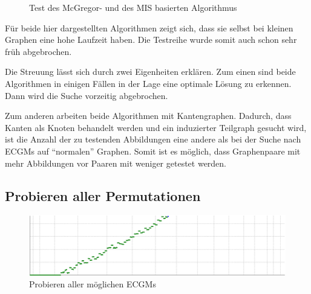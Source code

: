 \begin{figure}[htb]
\centering
\hspace*{\fill} %
\hspace*{\fill} %
\hspace*{\fill} %
\caption{Test des McGregor- und des MIS basierten Algorithmus}
\label{pic:MG_MIS}
\end{figure}

Für beide hier dargestellten Algorithmen zeigt sich, dass sie selbst bei kleinen 
Graphen eine hohe Laufzeit haben. Die Testreihe wurde somit auch schon sehr früh 
abgebrochen. 

Die Streuung lässt sich durch zwei Eigenheiten erklären. 
Zum einen sind beide 
Algorithmen in einigen Fällen in der Lage eine optimale Lösung zu erkennen. Dann wird 
die Suche vorzeitig abgebrochen. 

Zum anderen 
arbeiten beide Algorithmen mit Kantengraphen. Dadurch, dass Kanten als Knoten behandelt 
werden und ein induzierter Teilgraph gesucht wird, ist die Anzahl der zu testenden 
Abbildungen eine andere als bei der Suche nach ECGMs auf "`normalen"' Graphen. Somit 
ist es möglich, dass Graphenpaare mit mehr Abbildungen vor Paaren mit weniger 
getestet werden.

\subsection{Probieren aller Permutationen}
\begin{figure}[htb]
\centering
\includegraphics[width=\linewidth,height=\textheight,
keepaspectratio]{bilder/Permut}
\caption{Probieren aller möglichen ECGMs}
\label{pic:Permut}
\end{figure}

